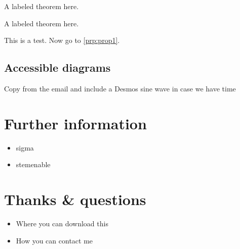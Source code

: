 \documentclass[
  17pt,
  english,
  a4paper]{extarticle}
\providecommand{\tightlist}{%
  \setlength{\itemsep}{0pt}\setlength{\parskip}{0pt}}
\theoremstyle{plain}
\theoremstyle{plain}
\theoremstyle{plain}
\theoremstyle{plain}
\theoremstyle{plain}
\theoremstyle{definition}
\theoremstyle{definition}
\theoremstyle{definition}
\theoremstyle{remark}
\let\BeginKnitrBlock\begin \let\EndKnitrBlock\end
\renewcommand{\;}{\,}
\begin{document}
\BeginKnitrBlock{Thought}
\protect\hypertarget{Thought:tho1}{}{ \label{tho:tho1} }A labeled theorem here.
\EndKnitrBlock{Thought}

\BeginKnitrBlock{Nugget}
\protect\hypertarget{Nugget:nug1}{}{ \label{nug:nug1} }A labeled theorem here.
\EndKnitrBlock{Nugget}

This is a test. Now go to \ref{prp:prop1}.

\hypertarget{accessible-diagrams}{%
\subsection{Accessible diagrams}\label{accessible-diagrams}}

Copy from the email and include a Desmos sine wave in case we have time

\hypertarget{further-information}{%
\section{Further information}\label{further-information}}

\begin{itemize}
\tightlist
\item
  sigma
\item
  stemenable
\end{itemize}

\hypertarget{thanks-questions}{%
\section{Thanks \& questions}\label{thanks-questions}}

\begin{itemize}
\tightlist
\item
  Where you can download this
\item
  How you can contact me
\end{itemize}
\end{document}
